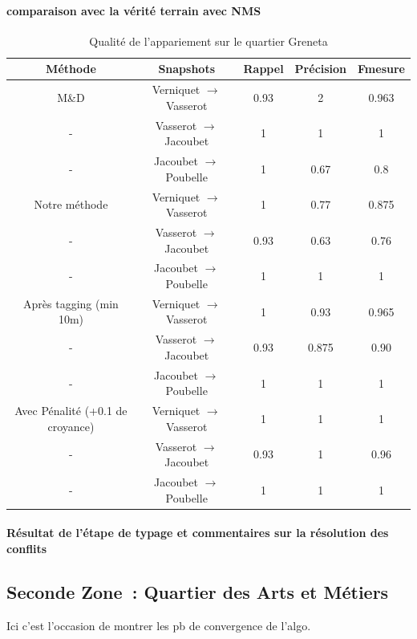 \documentclass[a4paper,12pt]{article}
\begin{document}
\paragraph{comparaison avec la vérité terrain avec NMS}
\begin{table}
\caption{Qualité de l'appariement sur le quartier Greneta}
\begin{tabular}{c|c|c|c|c|}
Méthode & Snapshots & Rappel & Précision & Fmesure \\ \hline
M\&D & Verniquet $\to$ Vasserot &  0.93 & 2 & 0.963 \\ \hline
- & Vasserot $\to$ Jacoubet &  1 & 1 & 1 \\ \hline
- & Jacoubet $\to$ Poubelle &  1 & 0.67 & 0.8 \\ \hline
\hline
Notre méthode & Verniquet $\to$ Vasserot &  1 & 0.77 & 0.875 \\ \hline
- & Vasserot $\to$ Jacoubet &  0.93 & 0.63 & 0.76 \\ \hline
- & Jacoubet $\to$ Poubelle &  1 & 1 & 1 \\ \hline
\hline
Après tagging (min 10m) & Verniquet $\to$ Vasserot &  1 & 0.93 & 0.965 \\ \hline
- & Vasserot $\to$ Jacoubet &  0.93 & 0.875 & 0.90 \\ \hline
- & Jacoubet $\to$ Poubelle &  1 & 1 & 1 \\ \hline
\hline
Avec Pénalité (+0.1 de croyance) & Verniquet $\to$ Vasserot &  1 & 1 & 1 \\ \hline
- & Vasserot $\to$ Jacoubet &  0.93 & 1 & 0.96 \\ \hline
- & Jacoubet $\to$ Poubelle &  1 & 1 & 1 \\ \hline

\end{tabular}
\end{table}

\paragraph{Résultat de l'étape de typage et commentaires sur la résolution des conflits}



\subsection{Seconde Zone~: Quartier des Arts et Métiers}
Ici c'est l'occasion de montrer les pb de convergence de l'algo.
\end{document}
